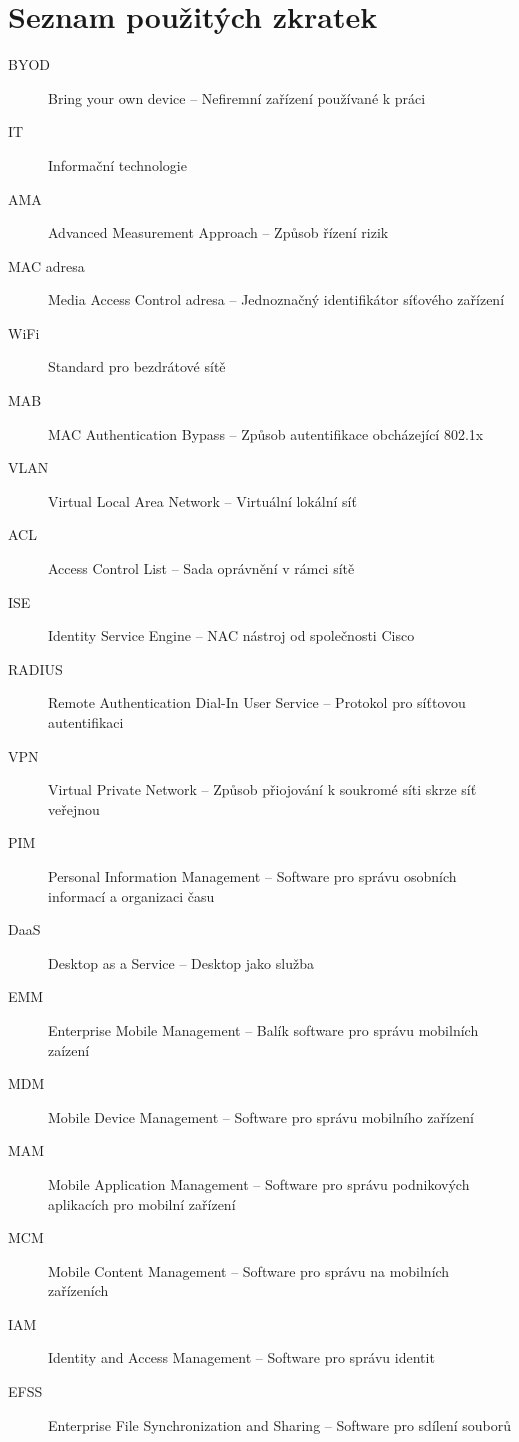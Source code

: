 \chapter{Seznam použitých zkratek}
\begin{description}
	\item[BYOD] Bring your own device -- Nefiremní zařízení používané k práci
	\item[IT] Informační technologie
	\item[AMA] Advanced Measurement Approach -- Způsob řízení rizik
	\item[MAC adresa] Media Access Control adresa -- Jednoznačný identifikátor síťového zařízení
	\item[WiFi] Standard pro bezdrátové sítě
	\item[MAB] MAC Authentication Bypass -- Způsob autentifikace obcházející 802.1x
	\item[VLAN] Virtual Local Area Network -- Virtuální lokální síť
	\item[ACL] Access Control List -- Sada oprávnění v rámci sítě
	\item[ISE] Identity Service Engine -- NAC nástroj od společnosti Cisco
	\item[RADIUS] Remote Authentication Dial-In User Service -- Protokol pro síťtovou autentifikaci
	\item[VPN] Virtual Private Network -- Způsob přiojování k soukromé síti skrze síť veřejnou
	\item[PIM] Personal Information Management -- Software pro správu osobních informací a organizaci času
	\item[DaaS] Desktop as a Service -- Desktop jako služba
	\item[EMM] Enterprise Mobile Management -- Balík software pro správu mobilních zaízení
	\item[MDM] Mobile Device Management -- Software pro správu mobilního zařízení
	\item[MAM] Mobile Application Management -- Software pro správu podnikových aplikacích pro mobilní zařízení
	\item[MCM] Mobile Content Management -- Software pro správu na mobilních zařízeních
	\item[IAM] Identity and Access Management -- Software pro správu identit
	\item[EFSS] Enterprise File Synchronization and Sharing -- Software pro sdílení souborů

\end{description}
